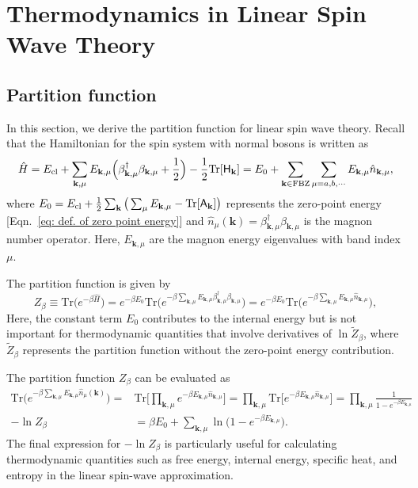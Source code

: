 \documentclass[aps, prx, nofootinbib, superscriptaddress]{revtex4-2}
\newcommand{\kvec}{\mathbf{k}}
\newcommand{\Tr}{\mathrm{Tr}}
\begin{document}
\newpage
\section{Thermodynamics in Linear Spin Wave Theory}

\subsection{Partition function}\label{subsec: Partition Function}
In this section, we derive the partition function for linear spin wave theory. 
Recall that the Hamiltonian for the spin system with normal bosons is written as 
\begin{align}
    \hat{H} = E_{\rm cl} + \sum_{\kvec, \mu} E_{\kvec, \mu} \Big( \beta^{\dagger}_{\kvec, \mu} \beta_{\kvec, \mu} + \frac{1}{2} \Big) - \frac{1}{2} \Tr [\mathsf{H}_{\kvec}] 
    = E_{0} + \sum_{\kvec \in \mathrm{FBZ}} \sum_{\mu = a, b, \cdots} E_{\kvec, \mu} \hat{n}_{\kvec, \mu},
\end{align}
where $E_{0} = E_{\rm cl} + \frac{1}{2} \sum_{\kvec} \big( \sum_{\mu} E_{\kvec, \mu} - \Tr [\mathsf{A}_{\kvec}] \big)$ represents the zero-point energy [Eqn.~\eqref{eq: def. of zero point energy}] and $\hat{n}_{\mu}(\kvec) = \beta^{\dagger}_{\kvec, \mu} \beta_{\kvec, \mu}$ is the magnon number operator. Here, $E_{\kvec, \mu}$ are the magnon energy eigenvalues with band index $\mu$.

The partition function is given by
\begin{equation}
    Z_{\beta} \equiv \Tr \big( e^{- \beta \hat{H}} \big) 
    = e^{- \beta E_{0}}  \Tr \big( e^{- \beta \sum_{\kvec, \mu} E_{\kvec, \mu} \beta^{\dagger}_{\kvec, \mu} \beta_{\kvec, \mu}} \big) 
    = e^{- \beta E_{0}} \Tr \big( e^{- \beta \sum_{\kvec, \mu} E_{\kvec, \mu} \hat{n}_{\kvec, \mu}} \big),
\end{equation}
Here, the constant term $E_0$ contributes to the internal energy but is not important for thermodynamic quantities that involve derivatives of $\ln \tilde{Z}_{\beta}$, where $\tilde{Z}_{\beta}$ represents the partition function without the zero-point energy contribution.

The partition function $Z_{\beta}$ can be evaluated as
\begin{subequations}\label{eq: explicit expressions for Z and log-Z}
    \begin{align}
        \Tr \big( e^{- \beta \sum_{\kvec, \mu} E_{\kvec, \mu} \hat{n}_{\mu}(\kvec)} \big) 
        = & \Tr \Big[ \prod_{\kvec, \mu} e^{- \beta E_{\kvec, \mu} \hat{n}_{\kvec, \mu}} \Big]
        = \prod_{\kvec, \mu} \Tr \Big[ e^{- \beta E_{\kvec, \mu} \hat{n}_{\kvec, \mu}} \Big] 
        =  \prod_{\kvec, \mu}  \frac{1}{1 - e^{- \beta E_{\kvec, \mu}}} \\
        - \ln Z_{\beta} &= \beta E_{0} + \sum_{\kvec, \mu} \ln \big( 1 - e^{- \beta E_{\kvec, \mu}} \big).
    \end{align}
\end{subequations}
The final expression for $-\ln Z_{\beta}$ is particularly useful for calculating thermodynamic quantities such as free energy, internal energy, specific heat, and entropy in the linear spin-wave approximation.
\end{document}
